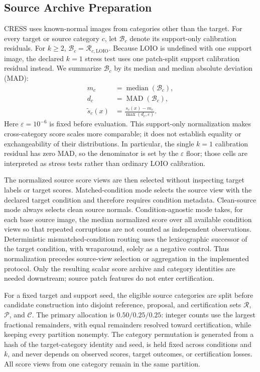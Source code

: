 \subsection{Source Archive Preparation}\label{sec:cress-source-construction}
CRESS uses known-normal images from categories other than the target. For every target or source category $c$, let $\mathcal{B}_c$ denote its support-only calibration residuals. For $k\geq2$, $\mathcal{B}_c=\mathcal{R}_{c,\mathrm{LOIO}}$. Because LOIO is undefined with one support image, the declared $k=1$ stress test uses one patch-split support calibration residual instead. We summarize $\mathcal B_c$ by its median and median absolute deviation (MAD):
\begin{equation}\label{eq:cress-normalization}
\begin{aligned}
    m_c &= \operatorname{median}(\mathcal{B}_c),\\
    d_c &= \operatorname{MAD}(\mathcal{B}_c),\\
    \widetilde{s}_c(x) &= \frac{s_c(x)-m_c}{\max(d_c,\varepsilon)}.
\end{aligned}
\end{equation}
Here $\varepsilon=10^{-6}$ is fixed before evaluation. This support-only normalization makes cross-category score scales more comparable; it does not establish equality or exchangeability of their distributions. In particular, the single $k=1$ calibration residual has zero MAD, so the denominator is set by the $\varepsilon$ floor; those cells are interpreted as stress tests rather than ordinary LOIO calibration.

The normalized source score views are then selected without inspecting target labels or target scores. Matched-condition mode selects the source view with the declared target condition and therefore requires condition metadata. Clean-source mode always selects clean source normals. Condition-agnostic mode takes, for each base source image, the median normalized score over all available condition views so that repeated corruptions are not counted as independent observations. Deterministic mismatched-condition routing uses the lexicographic successor of the target condition, with wraparound, solely as a negative control. Thus normalization precedes source-view selection or aggregation in the implemented protocol. Only the resulting scalar score archive and category identities are needed downstream; source patch features do not enter certification.

For a fixed target and support seed, the eligible source categories are split before candidate construction into disjoint reference, proposal, and certification sets $\mathcal{R}$, $\mathcal{P}$, and $\mathcal{C}$. The primary allocation is $0.50/0.25/0.25$: integer counts use the largest fractional remainders, with equal remainders resolved toward certification, while keeping every partition nonempty. The category permutation is generated from a hash of the target-category identity and seed, is held fixed across conditions and $k$, and never depends on observed scores, target outcomes, or certification losses. All score views from one category remain in the same partition.


